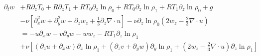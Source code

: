 \documentclass[letterpaper,12pt]{paper}
\newcommand{\lnrho}{\ensuremath{\ln \rho}}
\begin{document}
\begin{equation}
  \begin{aligned}
    \label{eq:ns_z_mfd}
    \partial_t w & + R \partial_z T_0 + R \partial_z T_1 + R
    T_0 \partial_z \lnrho_0 + R T_0 \partial_z \lnrho_1 + R
    T_1 \partial_z \lnrho_0 + g \\
&- \nu
    \left[ \partial_x^2 w + \partial_y^2 w + \partial_z w_z +
      \frac{1}{3} \partial_z \nabla \cdot u \right] - \nu \partial_z \lnrho_0 \left(2 w_z - \frac{2}{3} \nabla \cdot u  \right)  \\
    & = - u \partial_x w - v \partial_y w - w w_z - R T_1 \partial_z \lnrho_1 \\
    & + \nu \left[ (\partial_z u + \partial_x
      w)\partial_x \lnrho_1 + (\partial_z v + \partial_y w) \partial_y \lnrho_1  + \left( 2 w_z - \frac{2}{3} \nabla \cdot
        u\right) \partial_z \lnrho_1\right]\\
\end{aligned}
\end{equation}
\end{document}
